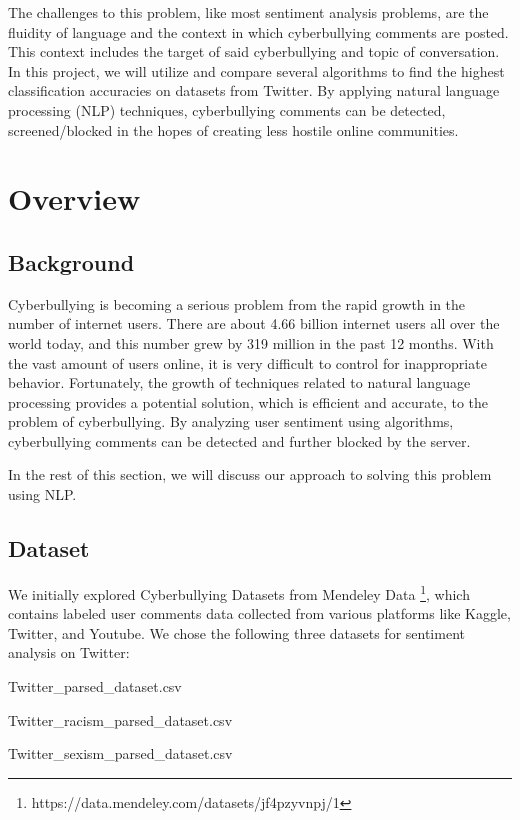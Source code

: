 \documentclass[conference]{IEEEtran}
\begin{document}
The challenges to this problem, like most sentiment analysis problems, are the fluidity of language and the context in which cyberbullying comments are posted. This context includes the target of said cyberbullying and topic of conversation. In this project, we will utilize and compare several algorithms to find the highest classification accuracies on datasets from Twitter. By applying natural language processing (NLP) techniques, cyberbullying comments can be detected, screened/blocked in the hopes of creating less hostile online communities. 


\section{Overview}

\subsection{Background}

Cyberbullying is becoming a serious problem from the rapid growth in the number of internet users. There are about 4.66 billion internet users all over the world today, and this number grew by 319 million in the past 12 months. With the vast amount of users online, it is very difficult to control for inappropriate behavior. Fortunately, the growth of techniques related to natural language processing provides a potential solution, which is efficient and accurate, to the problem of cyberbullying. By analyzing user sentiment using algorithms, cyberbullying comments can be detected and further blocked by the server.

In the rest of this section, we will discuss our approach to solving this problem using NLP.

\subsection{Dataset}

We initially explored Cyberbullying Datasets from Mendeley Data \footnote[1]{https://data.mendeley.com/datasets/jf4pzyvnpj/1}, which contains labeled user comments data collected from various platforms like Kaggle, Twitter, and Youtube. We chose the following three datasets for sentiment analysis on Twitter:

\begin{center}
Twitter\_parsed\_dataset.csv

Twitter\_racism\_parsed\_dataset.csv

Twitter\_sexism\_parsed\_dataset.csv
\end{center}
\end{document}

